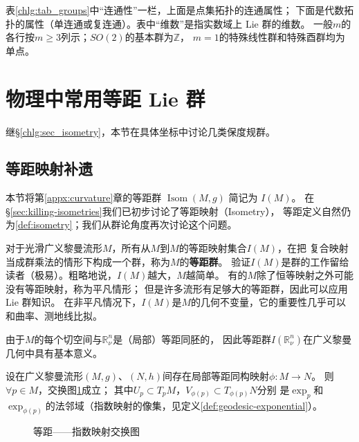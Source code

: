 {表\ref{chlg:tab_groups}中“连通性”一栏，上面是点集拓扑的连通属性；
下面是代数拓扑的属性（单连通或复连通）。表中“维数”是指实数域上 Lie 群的维数。
一般$m$的各行按$m\geqslant3$列示；$SO(2)$的基本群为$\mathbb Z$，
$m=1$的特殊线性群和特殊酉群均为单点。}

\section{物理中常用等距 Lie 群}
继\S\ref{chlg:sec_isometry}，本节在具体坐标中讨论几类保度规群。

\subsection{等距映射补遗}
本节将第\ref{appx:curvature}章的等距群 $\operatorname{Isom}(M,g)$ 简记为 $I(M)$。
在\S \ref{sec:killing-isometries}我们已初步讨论了等距映射（Isometry），
等距定义自然仍为\ref{def:isometry}；我们从群论角度再次讨论这个问题。

对于光滑广义黎曼流形$M$，所有从$M$到$M$的等距映射集合$I(M)$，在把
复合映射当成群乘法的情形下构成一个群，称为$M$的\textbf{等距群}。
验证$I(M)$是群的工作留给读者（极易）。粗略地说，$I(M)$越大，$M$越简单。
有的$M$除了恒等映射之外可能没有等距映射，称为平凡情形；
但是许多流形有足够大的等距群，因此可以应用 Lie 群知识。
在非平凡情况下，$I(M)$是$M$的几何不变量，它的重要性几乎可以和曲率、测地线比拟。

由于$M$的每个切空间与$\mathbb{R}^n_\nu$是（局部）等距同胚的，
因此等距群$I(\mathbb{R}^n_\nu)$在广义黎曼几何中具有基本意义。

\begin{theorem}
    设在广义黎曼流形$(M,g)$、$(N,h)$间存在局部等距同构映射$\phi:M\to N$。
    则$\forall p\in M$，交换图\ref{chlg:pic_exp-exchange}成立；
    其中$U_p\subset T_pM$，$V_{\phi(p)}\subset T_{\phi(p)}N$分别
    是$\exp_p$和$\exp_{\phi(p)}$的法邻域（指数映射的像集，见定义\ref{def:geodesic-exponential}）。
\end{theorem}

\begin{figure}[htb]
    \centering
    \caption{等距——指数映射交换图}\label{chlg:pic_exp-exchange}
\end{figure}

